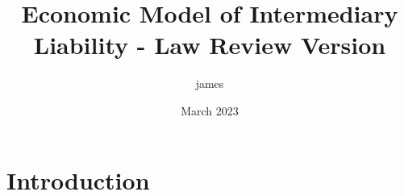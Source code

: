 \documentclass{article}
\title{Economic Model of Intermediary Liability - Law Review Version}
\author{james }
\date{March 2023}
\begin{document}
\maketitle

\section{Introduction}
\end{document}

